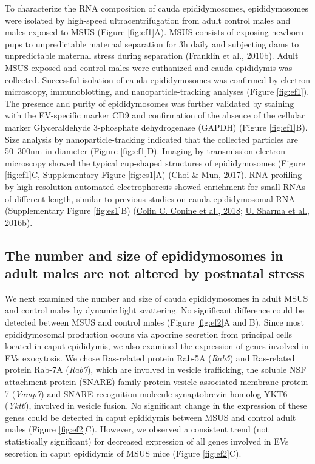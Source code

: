 \documentclass[12pt,twoside]{reedthesis}
\begin{document}
To characterize the RNA composition of cauda epididymosomes,
epididymosomes were isolated by high-speed ultracentrifugation from
adult control males and males exposed to MSUS (Figure \ref{fig:ef1}A). MSUS
consists of exposing newborn pups to unpredictable maternal separation
for 3h daily and subjecting dams to unpredictable maternal stress during
separation (\protect\hyperlink{ref-franklin_2010}{Franklin et al., 2010b}). Adult MSUS-exposed and control males were
euthanized and cauda epididymis was collected. Successful isolation of
cauda epididymosomes was confirmed by electron microscopy,
immunoblotting, and nanoparticle-tracking analyses (Figure \ref{fig:ef1}). The
presence and purity of epididymosomes was further validated by staining
with the EV-specific marker CD9 and confirmation of the absence of the
cellular marker Glyceraldehyde 3-phosphate dehydrogenase (GAPDH)
(Figure \ref{fig:ef1}B). Size analysis by nanoparticle-tracking indicated that the
collected particles are 50--300nm in diameter (Figure \ref{fig:ef1}D). Imaging by
transmission electron microscopy showed the typical cup-shaped
structures of epididymosomes (Figure \ref{fig:ef1}C, Supplementary Figure \ref{fig:es1}A)
(\protect\hyperlink{ref-choi_2017}{Choi \& Mun, 2017}). RNA profiling by high-resolution automated electrophoresis
showed enrichment for small RNAs of different length, similar to
previous studies on cauda epididymosomal RNA (Supplementary Figure \ref{fig:es1}B) (\protect\hyperlink{ref-conine_2018}{Colin C. Conine et al., 2018}; \protect\hyperlink{ref-sharma_2016}{U. Sharma et al., 2016b}).

\hypertarget{the-number-and-size-of-epididymosomes-in-adult-males-are-not-altered-by-postnatal-stress}{%
\subsection{The number and size of epididymosomes in adult males are not altered by postnatal stress}\label{the-number-and-size-of-epididymosomes-in-adult-males-are-not-altered-by-postnatal-stress}}

We next examined the number and size of cauda epididymosomes in adult
MSUS and control males by dynamic light scattering. No significant
difference could be detected between MSUS and control males (Figure \ref{fig:ef2}A
and B). Since most epididymosomal production occurs via apocrine
secretion from principal cells located in caput epididymis, we also
examined the expression of genes involved in EVs exocytosis. We chose
Ras-related protein Rab-5A (\emph{Rab5}) and Ras-related protein Rab-7A
(\emph{Rab7}), which are involved in vesicle trafficking, the soluble NSF
attachment protein (SNARE) family protein vesicle-associated membrane
protein 7 (\emph{Vamp7}) and SNARE recognition molecule synaptobrevin homolog
YKT6 (\emph{Ykt6}), involved in vesicle fusion. No significant change in the
expression of these genes could be detected in caput epididymis between
MSUS and control adult males (Figure \ref{fig:ef2}C). However, we observed a
consistent trend (not statistically significant) for decreased
expression of all genes involved in EVs secretion in caput epididymis of
MSUS mice (Figure \ref{fig:ef2}C).
\end{document}
